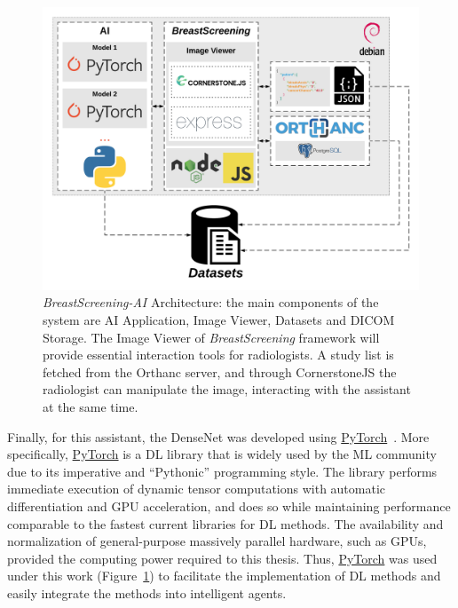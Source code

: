 \begin{figure}[htbp]
\centering
\includegraphics[width=0.95\linewidth]{images/fig041}
\caption{{\it BreastScreening-AI} Architecture: the main components of the system are AI Application, Image Viewer, Datasets and DICOM Storage. The Image Viewer of {\it BreastScreening} framework will provide essential interaction tools for radiologists. A study list is fetched from the Orthanc server, and through CornerstoneJS the radiologist can manipulate the image, interacting with the assistant at the same time.}
\label{fig:fig041}
\end{figure}

Finally, for this assistant, the DenseNet was developed using \href{https://pytorch.org/}{PyTorch}~\cite{NEURIPS2019_bdbca288}.
More specifically, \href{https://pytorch.org/}{PyTorch} is a \ac{DL} library that is widely used by the \ac{ML} community due to its imperative and ``Pythonic'' programming style.
The library performs immediate execution of dynamic tensor computations with automatic differentiation and \ac{GPU} acceleration, and does so while maintaining performance comparable to the fastest current libraries for \ac{DL} methods.
The availability and normalization of general-purpose massively parallel hardware, such as \acp{GPU}, provided the computing power required to this thesis.
Thus, \href{https://pytorch.org/}{PyTorch} was used under this work  (Figure~\ref{fig:fig041}) to facilitate the implementation of \ac{DL} methods and easily integrate the methods into intelligent agents.

